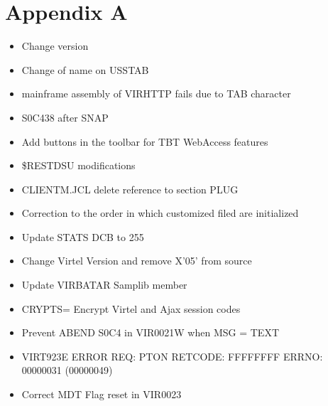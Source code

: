 \documentclass[letterpaper,10pt,english]{sphinxmanual}
\begin{document}
\chapter{Appendix A}
\label{\detokenize{TN202403:appendix-a}}
\sphinxAtStartPar
{}
\begin{itemize}
\item {} 
 Change version

\item {} 
 Change of name on USSTAB

\item {} 
 mainframe assembly of VIRHTTP fails due to TAB character

\item {} 
 S0C4\sphinxhyphen{}38 after SNAP

\item {} 
 Add buttons in the toolbar for TBT WebAccess features

\item {} 
 \$RESTDSU modifications

\item {} 
 CLIENTM.JCL delete reference to section PLUG

\item {} 
 Correction to the order in which customized filed are initialized

\item {} 
 Update STATS DCB to 255

\item {} 
 Change Virtel Version and remove X’05’ from source

\item {} 
 Update VIRBATAR Samplib member

\item {} 
 CRYPTS= Encrypt Virtel and Ajax session codes

\item {} 
 Prevent ABEND S0C4 in VIR0021W when MSG = TEXT

\item {} 
 VIRT923E ERROR REQ: PTON \sphinxhyphen{} RETCODE: FFFFFFFF ERRNO: 00000031 (00000049)

\item {} 
 Correct MDT Flag reset in VIR0023


\end{itemize}
\end{document}
